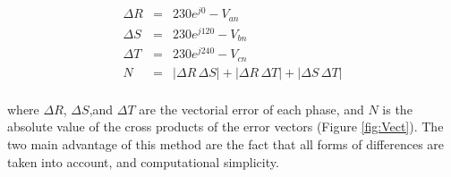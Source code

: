              \begin{equation}
                 \begin{array}{rcl}
                     \Delta R&=&230e^{j0}-V_{an}\\
                     \Delta S&=&230e^{j120}-V_{bn}\\
                     \Delta T&=&230e^{j240}-V_{cn}\\
                     N&=&|\Delta R\,\Delta S|+|\Delta R\,\Delta T|+|\Delta S\,\Delta T|\\
                 \end{array}
                 \label{equ:vect}
             \end{equation}

             where $\Delta R$, $\Delta S$,and $\Delta T$ are the vectorial error of each phase, and $N$ is the absolute value of the cross products of the error vectors (Figure \ref{fig:Vect}). The two main advantage of this method are the fact that all forms of differences are taken into account, and computational simplicity.
%

